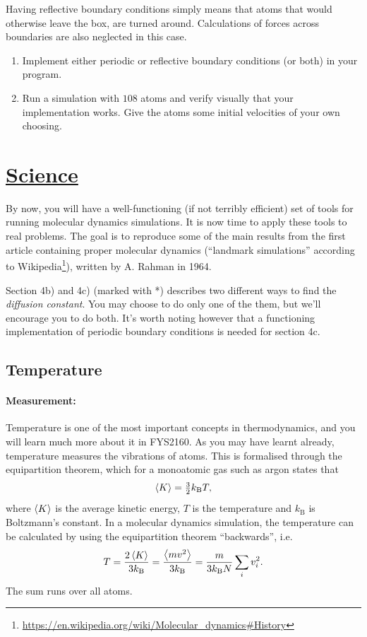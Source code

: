 \documentclass[11pt,british,a4paper]{report}
\begin{document}
Having reflective boundary conditions simply means that atoms that would otherwise leave the box, are turned around. Calculations of forces across boundaries are also neglected in this case.
\begin{enumerate}[label=\roman*.]
    \item Implement either periodic or reflective boundary conditions (or both) in your program.
    \item Run a simulation with \(108\) atoms and verify visually that your implementation works. Give the atoms some initial velocities of your own choosing.
\end{enumerate}


\section{\underline{Science}}
By now, you will have a well-functioning (if not terribly efficient) set of tools for running molecular dynamics simulations. It is now time to apply these tools to real problems. The goal is to reproduce some of the main results from the first article containing proper molecular dynamics (``landmark simulations'' according to Wikipedia\footnote{\url{https://en.wikipedia.org/wiki/Molecular_dynamics\#History}}), written by A. Rahman in 1964\cite{Rahman_1964}.

Section 4b) and 4c) (marked with *) describes two different ways to find the \textit{diffusion constant}. You may choose to do only one of the them, but we'll encourage you to do both. It's worth noting however that a functioning implementation of periodic boundary conditions is needed for section 4c.

\subsection{Temperature}
\paragraph{Measurement:} Temperature is one of the most important concepts in thermodynamics, and you will learn much more about it in FYS2160. As you may have learnt already, temperature measures the vibrations of atoms. This is formalised through the equipartition theorem, which for a monoatomic gas such as argon states that
\[
    \ev{K} = \tfrac{3}{2}k_\mathrm{B}T,
\]
where \(\ev{K}\) is the average kinetic energy, \(T\) is the temperature and \(k_\mathrm{B}\) is Boltzmann's constant. In a molecular dynamics simulation, the temperature can be calculated by using the equipartition theorem ``backwards'', i.e.
\[
    T = \frac{2\ev{K}}{3k_\mathrm{B}} = \frac{\ev{mv^2}}{3k_\mathrm{B}} = \frac{m}{3k_\mathrm{B}N}\sum_i v_i^2.
\]
The sum runs over all atoms.
\end{document}
